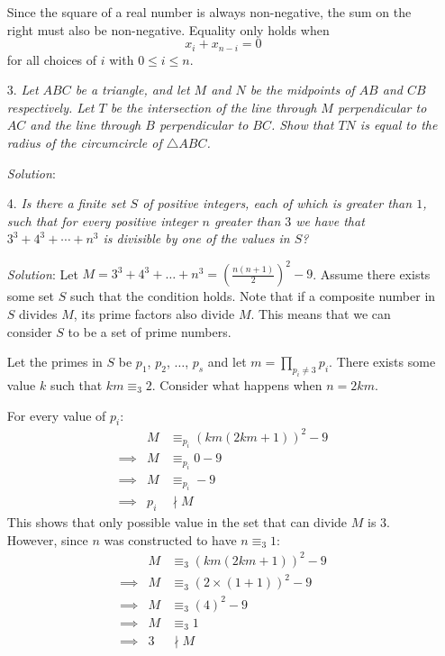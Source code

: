 \documentclass{article}
\begin{document}
\begin{enumerate}
  Since the square of a real number is always non-negative, the sum on the right must also be non-negative. Equality only holds when
  $$x_i + x_{n - i} = 0$$
  for all choices of $i$ with $0 \le i \le n$.
  


\item[3.] %
\textit{Let $ABC$ be a triangle, and let $M$ and $N$ be the midpoints of $AB$ and $CB$ respectively.
Let $T$ be the intersection of the line through $M$ perpendicular to $AC$ and the line through $B$ perpendicular to $BC$.
Show that $TN$ is equal to the radius of the circumcircle of $\triangle ABC$.}

\textit{Solution}:


\item[4.] %
\textit{Is there a finite set $S$ of positive integers, each of which is greater than $1$, such that for every positive integer $n$ greater than $3$ we have that $3^3 +4^3 +\dotsb +n^3$ is divisible by one of the values in $S$?}

\textit{Solution}:
Let $M = 3^3 + 4^3 + \dots + n^3 = (\frac{n(n + 1)}{2})^2 - 9$. Assume there exists some set $S$ such that the condition holds.
Note that if a composite number in $S$ divides $M$, its prime factors also divide $M$. This means that we can consider $S$ to be a set of prime numbers.

Let the primes in $S$ be $p_1$, $p_2$, $\dots$, $p_s$ and let $m = \prod_{p_i \neq 3}p_i$. There exists some value $k$ such that $km \equiv _3 2$. Consider what happens when $n = 2km$.

For every value of $p_i$:
\begin{align*}
  &&M &\equiv _{p_i} (km(2km + 1))^2 - 9 \\
  &\implies& M &\equiv _{p_i} 0 - 9 \\
  &\implies& M &\equiv _{p_i} -9 \\
  &\implies& p_i &\nmid M &
\end{align*}
This shows that only possible value in the set that can divide $M$ is $3$. However, since $n$ was constructed to have $n \equiv _3 1$:
\begin{align*}
  &&M &\equiv _3 (km(2km + 1))^2 - 9 \\
  &\implies& M &\equiv _3 (2 \times (1 + 1))^2 - 9 \\
  &\implies& M &\equiv _3 (4)^2 - 9 \\
  &\implies& M &\equiv _3 1 \\
  &\implies& 3 &\nmid M &
\end{align*}


\end{enumerate}
\end{document}
